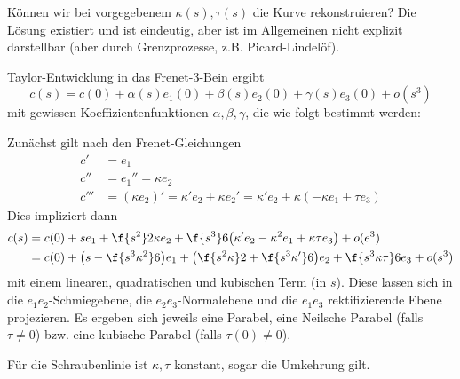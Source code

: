 Können wir bei vorgegebenem $\kappa(s), \tau(s)$ die Kurve rekonstruieren?
Die Lösung existiert und ist eindeutig, aber ist im Allgemeinen nicht explizit darstellbar (aber durch Grenzprozesse, z.B. Picard-Lindelöf).

Taylor-Entwicklung in das Frenet-3-Bein ergibt
\[
	c(s) = c(0) + \alpha(s)e_1(0) + \beta(s) e_2(0) + \gamma(s) e_3(0) + o(s^3)
\]
mit gewissen Koeffizientenfunktionen $\alpha, \beta, \gamma$, die wie folgt bestimmt werden:

Zunächst gilt nach den Frenet-Gleichungen
\begin{align*}
	c' &= e_1 \\
	c'' &= e_1'' = \kappa e_2 \\
	c''' &= (\kappa e_2)' = \kappa' e_2 + \kappa e_2' = \kappa' e_2 + \kappa(-\kappa e_1 + \tau e_3)
\end{align*}
Dies impliziert dann
\begin{align*}
	c(s) &= c(0) + se_1 + \f {s^2}2 \kappa e_2 + \f {s^3}6 \big( \kappa' e_2 - \kappa^2 e_1 + \kappa \tau e_3 \big) + o(e^3) \\
	&= c(0) + \big( s - \f {s^3 \kappa^2}6 \big) e_1 + \big( \f {s^2 \kappa}2 + \f {s^3\kappa'}6 \big) e_2 + \f{s^3 \kappa \tau}6 e_3 + o(s^3)
\end{align*}
mit einem linearen, quadratischen und kubischen Term (in $s$).
Diese lassen sich in die $e_1e_2$-Schmiegebene, die $e_2e_3$-Normalebene und die $e_1e_3$ rektifizierende Ebene projezieren.
Es ergeben sich jeweils eine Parabel, eine Neilsche Parabel (falls $\tau \neq 0$) bzw. eine kubische Parabel (falls $\tau(0) \neq 0$).


Für die Schraubenlinie ist $\kappa, \tau$ konstant, sogar die Umkehrung gilt.




